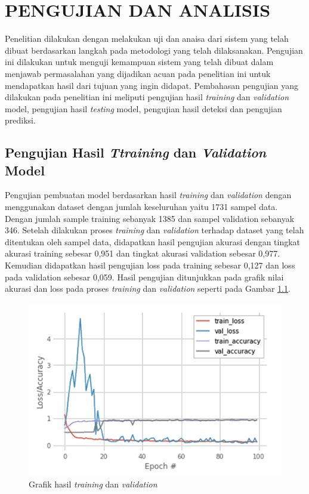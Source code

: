 \chapter{PENGUJIAN DAN ANALISIS}
\label{chap:pengujiananalisis}


Penelitian dilakukan dengan melakukan uji dan anaisa dari sistem yang telah dibuat berdasarkan langkah pada metodologi yang telah dilaksanakan. Pengujian ini dilakukan untuk menguji kemampuan sistem yang telah dibuat dalam menjawab permasalahan yang dijadikan acuan pada penelitian ini untuk mendapatkan hasil dari tujuan yang ingin didapat. Pembahasan pengujian yang dilakukan pada penelitian ini meliputi pengujian hasil \emph{training} dan \emph{validation} model, pengujian hasil \emph{testing} model, pengujian hasil deteksi dan pengujian prediksi.

\section{Pengujian Hasil \emph{Ttraining} dan \emph{Validation} Model}
\label{sec:PengujianTrainingValidation}

Pengujian pembuatan model berdasarkan hasil \emph{training} dan \emph{validation} dengan menggunakan dataset dengan jumlah keseluruhan yaitu 1731 sampel data. Dengan jumlah sample training sebanyak 1385 dan sampel validation sebanyak 346. Setelah dilakukan proses \emph{training} dan \emph{validation} terhadap dataset yang telah ditentukan oleh sampel data, didapatkan hasil pengujian akurasi dengan tingkat akurasi training sebesar 0,951 dan tingkat akurasi validation sebesar 0,977. Kemudian didapatkan hasil pengujian loss pada training sebesar 0,127 dan loss pada validation sebesar 0,059. Hasil pengujian ditunjukkan pada grafik nilai akurasi dan loss pada proses \emph{training} dan \emph{validation} seperti pada Gambar \ref{fig:HasilTrainingValidation}.

\begin{figure}[H]
  \centering
  \includegraphics[scale=0.65]{gambar/hasil training dan validation w.jpg}
  \caption{Grafik hasil \emph{training} dan \emph{validation}}
  \label{fig:HasilTrainingValidation}
\end{figure}


